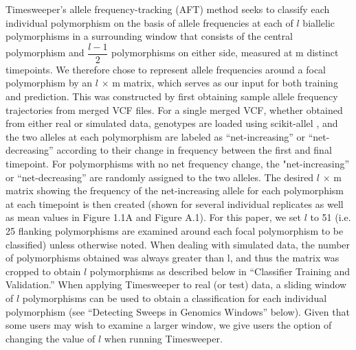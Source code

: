 Timesweeper’s allele frequency-tracking (AFT) method seeks to classify each individual polymorphism on the basis of allele frequencies at each of $l$ biallelic polymorphisms in a surrounding window that consists of the central polymorphism and $\dfrac{l-1}{2}$ polymorphisms on either side, measured at m distinct timepoints. We therefore chose to represent allele frequencies around a focal polymorphism by an $l$ × m matrix, which serves as our input for both training and prediction. This was constructed by first obtaining sample allele frequency trajectories from merged VCF files. For a single merged VCF, whether obtained from either real or simulated data, genotypes are loaded using scikit-allel \cite{milesCgghScikitallelV12021}, and the two alleles at each polymorphism are labeled as “net-increasing” or “net-decreasing” according to their change in frequency between the first and final timepoint. For polymorphisms with no net frequency change, the "net-increasing” or “net-decreasing” are randomly assigned to the two alleles. The desired $l$ × m matrix showing the frequency of the net-increasing allele for each polymorphism at each timepoint is then created (shown for several individual replicates as well as mean values in Figure 1.1A and Figure A.1). For this paper, we set $l$ to 51 (i.e. 25 flanking polymorphisms are examined around each focal polymorphism to be classified) unless otherwise noted. When dealing with simulated data, the number of polymorphisms obtained was always greater than l, and thus the matrix was cropped to obtain $l$ polymorphisms as described below in “Classifier Training and Validation.” When applying Timesweeper to real (or test) data, a sliding window of $l$ polymorphisms can be used to obtain a classification for each individual polymorphism (see “Detecting Sweeps in Genomics Windows” below). Given that some users may wish to examine a larger window, we give users the option of changing the value of $l$ when running Timesweeper. \\

